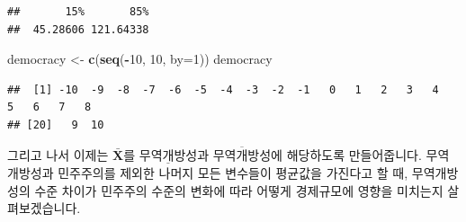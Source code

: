 \documentclass[
]{book}
\newenvironment{Shaded}{\begin{snugshade}}{\end{snugshade}}
\newcommand{\DataTypeTok}[1]{\textcolor[rgb]{0.13,0.29,0.53}{#1}}
\newcommand{\DecValTok}[1]{\textcolor[rgb]{0.00,0.00,0.81}{#1}}
\newcommand{\FloatTok}[1]{\textcolor[rgb]{0.00,0.00,0.81}{#1}}
\newcommand{\KeywordTok}[1]{\textcolor[rgb]{0.13,0.29,0.53}{\textbf{#1}}}
\newcommand{\NormalTok}[1]{#1}
\newcommand{\OperatorTok}[1]{\textcolor[rgb]{0.81,0.36,0.00}{\textbf{#1}}}
\newcommand{\StringTok}[1]{\textcolor[rgb]{0.31,0.60,0.02}{#1}}
\begin{document}
\begin{Shaded}
\end{Shaded}

\begin{verbatim}
##       15%       85% 
##  45.28606 121.64338
\end{verbatim}

\begin{Shaded}
\begin{Highlighting}[]
\NormalTok{democracy <-}\StringTok{ }\KeywordTok{c}\NormalTok{(}\KeywordTok{seq}\NormalTok{(}\OperatorTok{-}\DecValTok{10}\NormalTok{, }\DecValTok{10}\NormalTok{, }\DataTypeTok{by=}\DecValTok{1}\NormalTok{))}
\NormalTok{democracy}
\end{Highlighting}
\end{Shaded}

\begin{verbatim}
##  [1] -10  -9  -8  -7  -6  -5  -4  -3  -2  -1   0   1   2   3   4   5   6   7   8
## [20]   9  10
\end{verbatim}

그리고 나서 이제는 \(\bar{\textbf{X}}\)를 \(\underline{\text{무역개방성}}\)과 \(\overline{\text{무역개방성}}\)에 해당하도록 만들어줍니다. 무역개방성과 민주주의를 제외한 나머지 모든 변수들이 평균값을 가진다고 할 때, 무역개방성의 수준 차이가 민주주의 수준의 변화에 따라 어떻게 경제규모에 영향을 미치는지 살펴보겠습니다.
\end{document}
